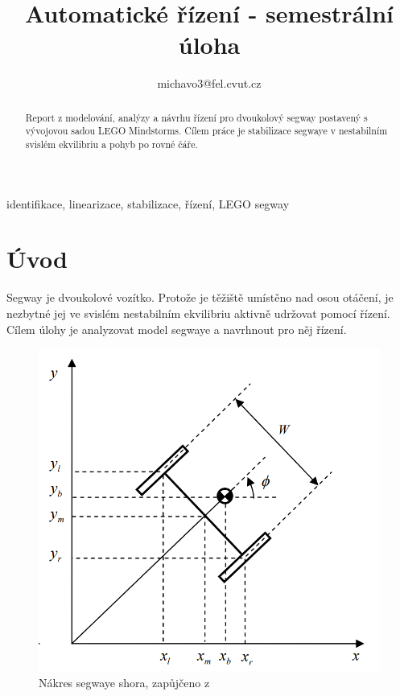 \documentclass[conference]{IEEEtran}
\begin{document}
\title{Automatické řízení - semestrální úloha}

\author{
michavo3@fel.cvut.cz}

\maketitle

\begin{abstract}
Report z modelování, analýzy a návrhu řízení pro dvoukolový segway postavený s vývojovou sadou LEGO Mindstorms.
Cílem práce je stabilizace segwaye v nestabilním svislém ekvilibriu a pohyb po rovné čáře.
\end{abstract}

\begin{IEEEkeywords}
    identifikace, linearizace, stabilizace, řízení, LEGO segway
\end{IEEEkeywords}

\section{Úvod}
\label{sec:uvod}
Segway je dvoukolové vozítko. Protože je těžiště umístěno nad osou otáčení, je nezbytné jej ve svislém nestabilním
ekvilibriu aktivně udržovat pomocí řízení. Cílem úlohy je analyzovat model segwaye a navrhnout pro něj řízení. 

\begin{figure}[htbp]
    \centerline{\includegraphics[width=0.9\linewidth]{segway_shora.png}}
    \caption{Nákres segwaye shora, zapůjčeno z \cite{model_based_design}}
    \label{fig:segway_shora}        
\end{figure}
\end{document}
